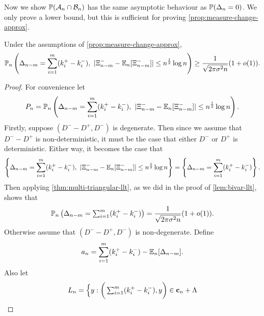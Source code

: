 Now we show $\P(\lltEvent_n\cap  \omegaEvent_n)$ has the same asymptotic behaviour as $\P(\Delta_n = 0)$. We only prove a lower bound, but this is sufficient for proving \cref{prop:measure-change-approx}.
\begin{lemma}
    \label{lem:mod-dev-local}
    Under the assumptions of \cref{prop:measure-change-approx},
    \begin{equation*}
        \mathbb P_n \left(
            \Delta_{n-m} = \sum_{i=1}^m (k_i^+ - k_i^-), \ 
            \abs{\Xi^-_{n-m} - \E_n[\Xi^-_{n-m}]} \leq n^{\frac{1}{2}} \log n
        \right)
        \geq \frac{1}{\sqrt{2 \pi \sigma^2 n}} (1 + \littleo(1)).
    \end{equation*}
\end{lemma}
\begin{proof}
    For convenience let
    \begin{equation*}
        P_n = \mathbb P_n \left(
            \Delta_{n-m} = \sum_{i=1}^m (k_i^+ - k_i^-), \ 
            \abs{\Xi^-_{n-m} - \E_n[\Xi^-_{n-m}]} \leq n^{\frac{1}{2}} \log n
        \right).
    \end{equation*}
    Firstly, suppose $(D^- - D^+, D^-)$ is degenerate. Then since we assume that $D^- - D^+$ is non-deterministic, it must be the case that either $D^-$ or $D^+$ is deterministic. Either way, it becomes the case that
    \begin{equation*}
        \left\{
            \Delta_{n-m} = \sum_{i=1}^m (k_i^+ - k_i^-), \ 
            \abs{\Xi^-_{n-m} - \E_n[\Xi^-_{n-m}]} \leq n^{\frac{1}{2}} \log n
        \right\}
        =
        \left\{
            \Delta_{n-m} = \sum_{i=1}^m (k_i^+ - k_i^-)
        \right\}.
    \end{equation*}
    Then applying \cref{thm:multi-triangular-llt}, as we did in the proof of \cref{lem:bivar-llt}, shows that
    \begin{equation*}
        \P_n\left( 
            \Delta_{n-m} = \textstyle \sum_{i=1}^m (k_i^+ - k_i^-)
        \right) = \frac{1}{\sqrt{2 \pi \sigma^2 n}} (1 + \littleo(1)).
    \end{equation*}
    Otherwise assume that $(D^- - D^+, D^-)$ is non-degenerate. Define
    \begin{equation*}
        a_n = \sum_{i=1}^m (k_i^+ - k_i^-) - \E_n[\Delta_{n-m}].
    \end{equation*}
    Also let
    \begin{equation*}
        L_n = \Big\{
            y : \bigg( \textstyle\sum_{i=1}^m (k_i^+ - k_i^-), y \bigg) \in \vc_n + \lattice

\end{equation*}
\end{proof}
